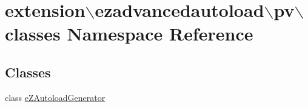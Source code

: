 \hypertarget{namespaceextension_1_1ezadvancedautoload_1_1pv_1_1classes}{\section{extension$\backslash$ezadvancedautoload$\backslash$pv$\backslash$classes \-Namespace \-Reference}
\label{namespaceextension_1_1ezadvancedautoload_1_1pv_1_1classes}
}
\subsection*{\-Classes}
\begin{DoxyCompactItemize}
\item 
class \hyperlink{classextension_1_1ezadvancedautoload_1_1pv_1_1classes_1_1e_z_autoload_generator}{e\-Z\-Autoload\-Generator}
\end{DoxyCompactItemize}
